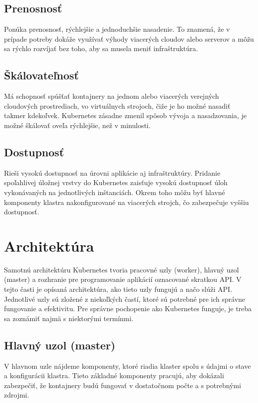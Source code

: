 \subsection*{Prenosnosť}
Ponúka prenosnosť, rýchlejšie a jednoduchšie nasadenie. To znamená, že v prípade potreby dokáže využívať výhody viacerých cloudov alebo serverov a môžu sa rýchlo rozvíjať bez toho, aby sa musela meniť infraštruktúra.

\subsection*{Škálovateľnosť}
Má schopnosť spúšťať kontajnery na jednom alebo viacerých verejných cloudových prostrediach, vo virtuálnych strojoch, čiže je ho možné nasadiť takmer kdekoľvek. Kubernetes zásadne zmenil spôsob vývoja a nasadzovania, je možné škálovať oveľa rýchlejšie, než v minulosti.

\subsection*{Dostupnosť}
Rieši vysokú dostupnosť na úrovni aplikácie aj infraštruktúry. Pridanie spoľahlivej úložnej vrstvy do Kubernetes zaisťuje vysokú dostupnosť úloh vykonávaných na jednotlivých inštanciách. Okrem toho môžu byť hlavné komponenty klastra nakonfigurované na viacerých strojch, čo zabezpečuje vyššiu dostupnosť.

\section{Architektúra}
Samotnú architektúru Kubernetes tvoria pracovné uzly (worker), hlavný uzol (master) a rozhranie pre programovanie aplikácií oznacované skratkou API. V tejto časti je opísaná architektúra, ako tieto uzly fungujú a načo slúži API. Jednotlivé uzly sú zložené z niekoľkých častí, ktoré sú potrebné pre ich správne fungovanie a efektivitu. Pre správne pochopenie ako Kubernetes funguje, je treba sa zoznámiť najmä s niektorými termínmi.

\subsection{Hlavný uzol (master)}

V hlavnom uzle nájdeme komponenty, ktoré riadia klaster spolu s údajmi o stave a konfigurácii klastra. Tieto základné komponenty pracujú, aby dokázali zabezpečiť, že kontajnery budú fungovať v dostatočnom počte a s potrebnými zdrojmi.

